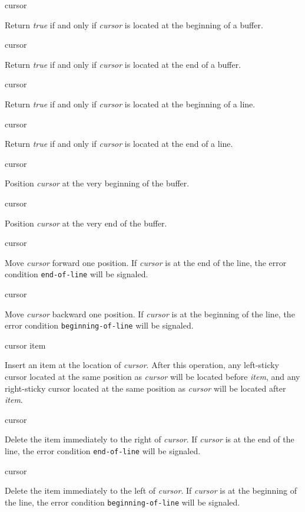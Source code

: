  {cursor}

Return \textit{true} if and only if \textit{cursor} is located at the
beginning of a buffer.

 {cursor}

Return \textit{true} if and only if \textit{cursor} is located at the
end of a buffer.

 {cursor}

Return \textit{true} if and only if \textit{cursor} is located at the
beginning of a line.

 {cursor}

Return \textit{true} if and only if \textit{cursor} is located at the
end of a line.

 {cursor}

Position \textit{cursor} at the very beginning of the buffer.

 {cursor}

Position \textit{cursor} at the very end of the buffer.

 {cursor}

Move \textit{cursor} forward one position.  If \emph{cursor} is at the
end of the line, the error condition \texttt{end-of-line} will be
signaled.

 {cursor}

Move \textit{cursor} backward one position.  If \emph{cursor} is at
the beginning of the line, the error condition
\texttt{beginning-of-line} will be signaled.

 {cursor item}

Insert an item at the location of \textit{cursor}.  After this
operation, any left-sticky cursor located at the same position as
\textit{cursor} will be located before \textit{item}, and any
right-sticky cursor located at the same position as \textit{cursor}
will be located after \textit{item}.

 {cursor}

Delete the item immediately to the right of \emph{cursor}.  If
\emph{cursor} is at the end of the line, the error condition
\texttt{end-of-line} will be signaled.

 {cursor}

Delete the item immediately to the left of \emph{cursor}.  If
\emph{cursor} is at the beginning of the line, the error condition
\texttt{beginning-of-line} will be signaled.

